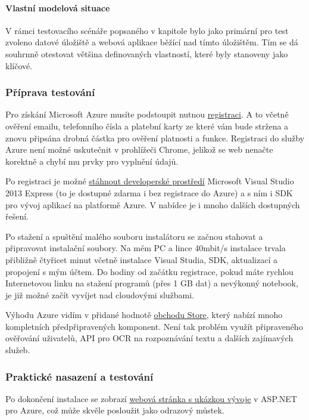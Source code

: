 \paragraph{Vlastní modelová situace}
V rámci testovacího scénáře popsaného v kapitole  bylo jako primární pro test zvoleno datové úložiště a webová aplikace běžící nad tímto úložištěm. Tím se dá souhrnně otestovat většina definovaných vlastností, které byly stanoveny jako klíčové.

\subsubsection{Příprava testování}
Pro získání Microsoft Azure musíte podstoupit nutnou \href{https://account.windowsazure.com}{registraci\cite{azure:web}}. A to včetně ověření emailu, telefonního čísla a platební karty ze které vám bude stržena a znovu připsána drobná částka pro ověření platnosti a funkce.
Registraci do služby Azure není možné uskutečnit v prohlížeči Chrome, jelikož se web nenačte korektně a chybí mu prvky pro vyplnění údajů.

Po registraci je možné \href{http://www.windowsazure.com/en-us/downloads/}{stáhnout developerské prostředí\cite{azure:download}} Microsoft Visual Studio 2013 Express (to je dostupné zdarma i bez registrace do Azure) a s ním i SDK pro vývoj aplikací na platformě Azure. V nabídce je i mnoho dalších dostupných řešení.

Po stažení a spuštění malého souboru instalátoru se začnou stahovat a připravovat instalační soubory. Na mém PC a lince 40mbit/s instalace trvala přibližně čtyřicet minut včetně instalace Visual Studia, SDK, aktualizací a propojení s mým účtem. Do hodiny od začátku registrace, pokud máte rychlou Internetovou linku na stažení programů (přes 1 GB dat) a nevýkonný notebook, je již možné začít vyvíjet nad cloudovými službami.

Výhodu Azure vidím v přidané hodnotě \href{http://www.windowsazure.com/en-us/gallery/store/}{obchodu Store\cite{azure:store}}, který nabízí mnoho kompletních předpřipravených komponent. Není tak problém využít připraveného ověřování uživatelů, API pro OCR na rozpoznávání textu a dalších zajímavých služeb.

\subsubsection{Praktické nasazení a testování}
Po dokončení instalace se zobrazí \href{http://www.windowsazure.com/en-us/documentation/articles/web-sites-dotnet-get-started/}{webová stránka s ukázkou vývoje\cite{azure:howto}} v ASP.NET pro Azure, což může skvěle posloužit jako odrazový můstek.

